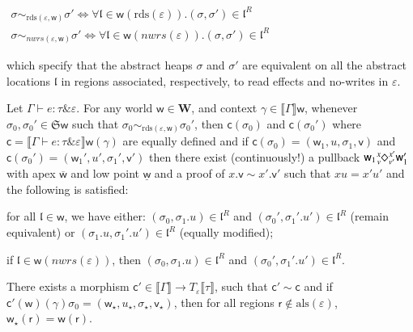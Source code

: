 \documentclass[orivec]{llncs}
\newcommand{\sq}[4]{\tensor*[^{#1}_{#2}]{\Diamond}{^{#3}_{#4}}}
\newcommand{\und}[1]{\underline{#1}}
\newcommand{\rdsin}[1]{\mathrm{rds}({#1})}
\newcommand{\alsin}[1]{\mathrm{als}({#1})}
\newcommand{\eff}{\varepsilon}
\newcommand{\regid}{\ensuremath{\mathsf{r}}}
\newcommand{\sem}[1]{\ensuremath{\llbracket {#1} \rrbracket}}
\newcommand{\nwrs}{{\ensuremath{\mathit{nwrs}}}}
\newcommand{\loc}{\mathfrak{l}}
\newcommand\w{\ensuremath{\mathsf{w}}\xspace}
\newcommand{\world}{\ensuremath{\mathbf{W}}\xspace}
\newcommand{\Astores}{\mathfrak{S}}
\newcommand\val{\ensuremath{\mathsf{v}}\xspace}
\newcommand\cval{\ensuremath{\mathsf{c}}\xspace}
\newcommand{\ety}[2]{{#1}\mathrel{\&}{#2}}
\begin{document}
\(
\begin{array}{c}
\sigma \sim_{\rdsin{\eff, \w}} \sigma' \iff \forall \loc \in
\w(\rdsin{\eff}). (\sigma, \sigma') \in \loc^R \\
\sigma \sim_{\nwrs(\eff, \w)} \sigma' \iff \forall \loc \in
\w(\nwrs(\eff)). (\sigma, \sigma') \in \loc^R
\end{array}
\)

\noindent
which specify that the abstract heaps $\sigma$ and $\sigma'$ are
\fi
equivalent on all the abstract locations $\loc$ in regions associated,
respectively, to read effects and no-writes in $\eff$.  


\begin{lemma}\label{lemmasix}
\label{lem:invariant}
Let $\Gamma \vdash e : \ety{\tau}{\eff}$. For any world $\w \in \world$,
and context $\gamma \in \sem{\Gamma}\w$, whenever $\sigma_0 , \sigma_0' \in
\Astores\w$ such that $\sigma_0
\sim_{\rdsin{\eff, \w}} \sigma_0'$, then $\cval(\sigma_0)$ and
$\cval(\sigma_0')$ where $\cval =\sem{\Gamma \vdash e :
\ety{\tau}{\eff}}\w(\gamma)$ are
equally defined  and if $\cval(\sigma_0)=(\w_1, u, \sigma_1,
\val)$ and 
$\cval(\sigma_0') = (\w_1', u', \sigma_1', \val')$
then there exist (continuously!) a pullback 
 $\w_1 \sq{x}{v}{x'}{v'} \w_1'$ with apex
$\overline{\w}$ and low point $\und{\w}$ and a proof of $x.\val\sim x'.\val'$ such that $xu=x'u'$ and the following is satisfied:
\begin{compactenum}
 \item for all $\loc \in \w$, we have either: $(\sigma_0,
\sigma_1.u) \in \loc^R$
and $(\sigma_0', \sigma_1'.u') \in \loc^R$ (remain
equivalent) or
$(\sigma_1.u, \sigma_1'.u') \in \loc^R$ (equally modified);
 \item if $\loc \in \w(\nwrs(\eff))$, then $(\sigma_0,
\sigma_1.u) \in \loc^R$ and $(\sigma_0',
\sigma_1'.u') \in \loc^R$.

\item There exists a morphism $\cval' \in \sem{\Gamma}\to T_\eff
\sem{\tau}$, such that  $\cval' \sim \cval$ and if
$\cval'(\w)(\gamma)\sigma_0 = (\w_\star, u_\star, \sigma_\star,
\val_\star)$, then for all regions $\regid \notin \alsin{\eff}$,
$\w_\star(\regid) = \w(\regid)$. 
\end{compactenum}
\end{lemma}
\end{document}
